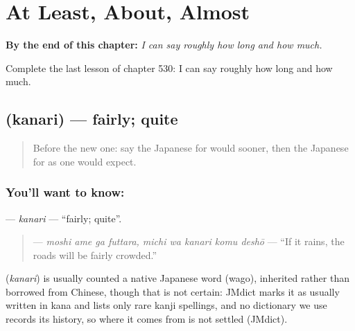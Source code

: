 
\chapter{At Least, About, Almost}
\label{ch:ja-at-least-about-almost}

\begin{chapteropening}
\textbf{By the end of this chapter:} \emph{I can say roughly how long and how much.}

Complete the last lesson of chapter 530: I can say roughly how long and how much.
\end{chapteropening}

\section[\texorpdfstring{\ja{かなり} (kanari)}{かなり (kanari)}]{ (kanari) — fairly; quite}

\label{lesson:JA-C530-kanari}



\begin{quote}
Before the new one: say the Japanese for would sooner, then the Japanese for as one would expect.
\end{quote}

\subsection*{You'll want to know: }
\textbf{} — \emph{kanari} — \textquotedblleft{}fairly; quite\textquotedblright{}.

\begin{quote}
\textbf{    } — \emph{moshi ame ga futtara, michi wa kanari komu deshō} — \textquotedblleft{}If it rains, the roads will be fairly crowded.\textquotedblright{}
\end{quote}

\begin{cousinweb}
\textbf{} (\emph{kanari}) is usually counted a native Japanese word (wago), inherited rather than borrowed from Chinese, though that is not certain: JMdict marks it as usually written in kana and lists only rare kanji spellings, and no dictionary we use records its history, so where it comes from is not settled (JMdict).
\end{cousinweb}

